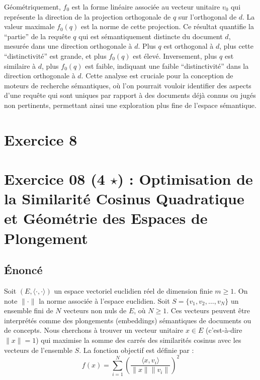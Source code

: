 \documentclass[11pt,a4paper]{report}
\begin{document}
Géométriquement, \(f_0\) est la forme linéaire associée au vecteur
unitaire \(v_0\) qui représente la direction de la projection
orthogonale de \(q\) sur l'orthogonal de \(d\). La valeur maximale
\(f_0(q)\) est la norme de cette projection. Ce résultat quantifie la
``partie'' de la requête \(q\) qui est sémantiquement distincte du
document \(d\), mesurée dans une direction orthogonale à \(d\). Plus
\(q\) est orthogonal à \(d\), plus cette ``distinctivité'' est grande,
et plus \(f_0(q)\) est élevé. Inversement, plus \(q\) est similaire à
\(d\), plus \(f_0(q)\) est faible, indiquant une faible
``distinctivité'' dans la direction orthogonale à \(d\). Cette analyse
est cruciale pour la conception de moteurs de recherche sémantiques, où
l'on pourrait vouloir identifier des aspects d'une requête qui sont
uniques par rapport à des documents déjà connus ou jugés non pertinents,
permettant ainsi une exploration plus fine de l'espace sémantique.


\section*{Exercice 8}
\hypertarget{exercice-08-4-star-optimisation-de-la-similarituxe9-cosinus-quadratique-et-guxe9omuxe9trie-des-espaces-de-plongement}{%
\section{\texorpdfstring{Exercice 08 (4 \(\star\)) : Optimisation de la
Similarité Cosinus Quadratique et Géométrie des Espaces de
Plongement}{Exercice 08 (4 \textbackslash star) : Optimisation de la Similarité Cosinus Quadratique et Géométrie des Espaces de Plongement}}\label{exercice-08-4-star-optimisation-de-la-similarituxe9-cosinus-quadratique-et-guxe9omuxe9trie-des-espaces-de-plongement}}

\hypertarget{uxe9noncuxe9}{%
\subsection{Énoncé}\label{uxe9noncuxe9}}

Soit \((E, \langle \cdot, \cdot \rangle)\) un espace vectoriel euclidien
réel de dimension finie \(m \ge 1\). On note \(\|\cdot\|\) la norme
associée à l'espace euclidien. Soit \(S = \{v_1, v_2, \dots, v_N\}\) un
ensemble fini de \(N\) vecteurs non nuls de \(E\), où \(N \ge 1\). Ces
vecteurs peuvent être interprétés comme des plongements (embeddings)
sémantiques de documents ou de concepts. Nous cherchons à trouver un
vecteur unitaire \(x \in E\) (c'est-à-dire \(\|x\|=1\)) qui maximise la
somme des carrés des similarités cosinus avec les vecteurs de l'ensemble
\(S\). La fonction objectif est définie par :
\[ f(x) = \sum_{i=1}^N \left(\frac{\langle x, v_i \rangle}{\|x\| \|v_i\|}\right)^2 \]
\end{document}
